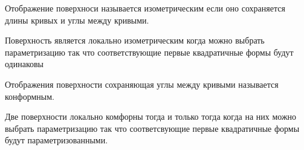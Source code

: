 \begin{define}
  Отображение поверхноси называется изометрическим если оно сохраняется длины
  кривых и углы между кривыми.
\end{define}

\begin{theorem}
  Поверхность является локально изометрическим когда можно выбрать
  параметризацию так что соответствующие первые квадратичные формы будут
  одинаковы
\end{theorem}

\begin{define}
  Отображения поверхности сохраняющая углы между кривыми называется
  конформным.
\end{define}

\begin{theorem}
  Две поверхности локально комфорны тогда и только тогда когда на них можно
  выбрать параметризацию так что соответсвующие первые квадратичные формы будут
  параметризованными.
\end{theorem}